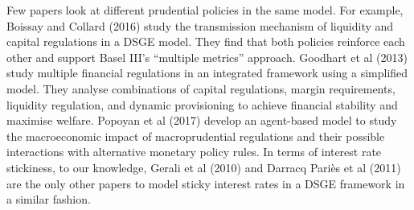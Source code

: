 \documentclass[12pt]{article}
\numberwithin{equation}{section}
\begin{document}
Few papers look at different prudential policies in the same model. For example, Boissay and Collard (2016) study the transmission mechanism of liquidity and capital regulations in a DSGE model. They find that both policies reinforce each other and support Basel III’s “multiple metrics” approach. Goodhart et al (2013) study multiple financial regulations in an integrated framework using a simplified model. They analyse combinations of capital regulations, margin requirements, liquidity regulation, and dynamic provisioning to achieve financial stability and maximise welfare. Popoyan et al (2017) develop an agent-based model to study the macroeconomic impact of macroprudential regulations and their possible interactions with alternative monetary policy rules.
In terms of interest rate stickiness, to our knowledge, Gerali et al (2010) and Darracq Pariès et al (2011) are the only other papers to model sticky interest rates in a DSGE framework in a similar fashion.
\end{document}
